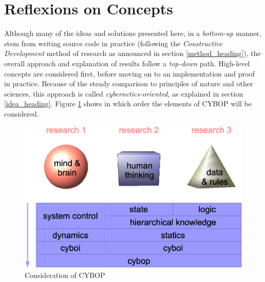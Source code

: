 %
%
%
%
%
%
%

\section{Reflexions on Concepts}
\label{reflexions_on_concepts_heading}

Although many of the ideas and solutions presented here, in a \emph{bottom-up}
manner, stem from writing source code in practice (following the
\emph{Constructive Development} method of research as announced in section
\ref{method_heading}), the overall approach and explanation of results follow a
\emph{top-down} path. High-level concepts are considered first, before moving
on to an implementation and proof in practice. Because of the steady comparison
to principles of nature and other sciences, this approach is called
\emph{cybernetics-oriented}, as explained in section \ref{idea_heading}. Figure
\ref{approach_figure} shows in which order the elements of CYBOP will be
considered.

\begin{figure}[ht]
    \begin{center}
        \includegraphics[scale=0.2]{vector/approach.eps}
        \caption{Consideration of CYBOP}
        \label{approach_figure}
    \end{center}
\end{figure}

